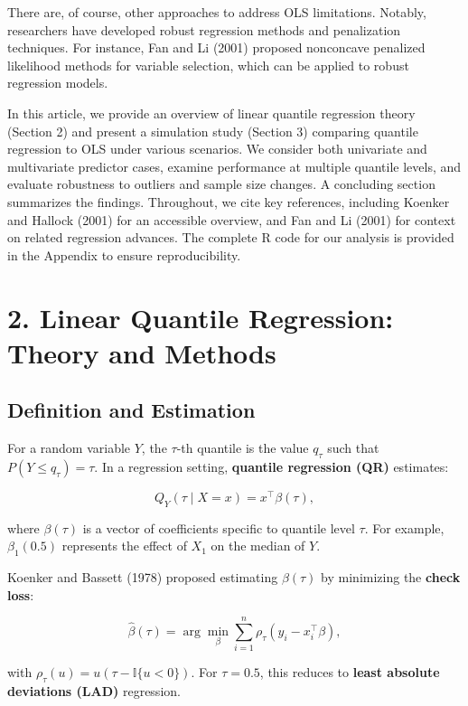 \documentclass[fleqn,8pt]{latex/stylish_article} %
\begin{document}
There are, of course, other approaches to address OLS limitations. Notably, researchers have developed robust regression methods and penalization techniques. For instance, Fan and Li (2001) proposed nonconcave penalized likelihood methods for variable selection, which can be applied to robust regression models.

In this article, we provide an overview of linear quantile regression theory (Section 2) and present a simulation study (Section 3) comparing quantile regression to OLS under various scenarios. We consider both univariate and multivariate predictor cases, examine performance at multiple quantile levels, and evaluate robustness to outliers and sample size changes. A concluding section summarizes the findings. Throughout, we cite key references, including Koenker and Hallock (2001) for an accessible overview, and Fan and Li (2001) for context on related regression advances. The complete R code for our analysis is provided in the Appendix to ensure reproducibility.

\section{2. Linear Quantile Regression: Theory and Methods}\label{linear-quantile-regression-theory-and-methods}

\subsection{Definition and Estimation}\label{definition-and-estimation}

For a random variable \(Y\), the \(\tau\)-th quantile is the value \(q_\tau\) such that \(P(Y \le q_\tau) = \tau\). In a regression setting, \textbf{quantile regression (QR)} estimates:

\[
Q_Y(\tau \mid X = x) = x^\top \beta(\tau),
\]

where \(\beta(\tau)\) is a vector of coefficients specific to quantile level \(\tau\). For example, \(\beta_1(0.5)\) represents the effect of \(X_1\) on the median of \(Y\).

Koenker and Bassett (1978) proposed estimating \(\beta(\tau)\) by minimizing the \textbf{check loss}:

\[
\hat\beta(\tau) = \arg\min_\beta \sum_{i=1}^n \rho_\tau(y_i - x_i^\top \beta),
\]

with \(\rho_\tau(u) = u(\tau - \mathbb{I}\{u < 0\})\). For \(\tau = 0.5\), this reduces to \textbf{least absolute deviations (LAD)} regression.
\end{document}
